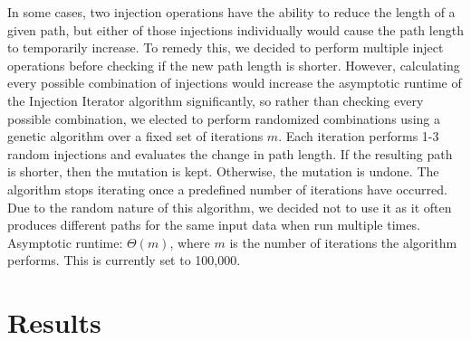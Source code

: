 \documentclass{article}
\begin{document}
In some cases, two injection operations have the ability to reduce the length
of a given path, but either of those injections individually would cause the
path length to temporarily increase. To remedy this, we decided to perform
multiple inject operations before checking if the new path length is shorter.
However, calculating every possible combination of injections would increase
the asymptotic runtime of the Injection Iterator algorithm significantly, so
rather than checking every possible combination, we elected to perform
randomized combinations using a genetic algorithm over a fixed set of
iterations $m$. Each iteration performs 1-3 random injections and evaluates the
change in path length. If the resulting path is shorter, then the mutation is
kept. Otherwise, the mutation is undone. The algorithm stops iterating once a
predefined number of iterations have occurred.  Due to the random nature of
this algorithm, we decided not to use it as it often produces different paths
for the same input data when run multiple times.\\Asymptotic runtime: $\Theta
(m)$, where $m$ is the number of iterations the algorithm performs. This is
currently set to 100,000.

\section*{Results}
\end{document}
